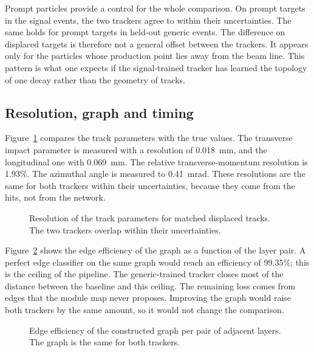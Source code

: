 Prompt particles provide a control for the whole comparison. On prompt targets in the signal events,
the two trackers agree to within their uncertainties. The same holds for prompt targets in held-out
generic events. The difference on displaced targets is therefore not a general offset between the
trackers. It appears only for the particles whose production point lies away from the beam line.
This pattern is what one expects if the signal-trained tracker has learned the topology of one decay
rather than the geometry of tracks.

\subsection{Resolution, graph and timing}
\label{sec:resolution}

Figure~\ref{fig:resolution} compares the track parameters with the true values. The transverse
impact parameter is measured with a resolution of 0.018~mm, and the longitudinal one with 0.069~mm.
The relative transverse-momentum resolution is 1.93\%. The azimuthal angle is measured to 0.41~mrad.
These resolutions are the same for both trackers within their uncertainties, because they come from
the hits, not from the network.

\begin{figure}[tbp]
  \centering
  \caption{Resolution of the track parameters for matched displaced tracks. The two trackers overlap within their uncertainties.}
  \label{fig:resolution}
\end{figure}

Figure~\ref{fig:graph} shows the edge efficiency of the graph as a function of the layer pair. A
perfect edge classifier on the same graph would reach an efficiency of 99.35\%; this is the ceiling
of the pipeline. The generic-trained tracker closes most of the distance between the baseline and
this ceiling. The remaining loss comes from edges that the module map never proposes. Improving the
graph would raise both trackers by the same amount, so it would not change the comparison.

\begin{figure}[tbp]
  \centering
  \caption{Edge efficiency of the constructed graph per pair of adjacent layers. The graph is the same for both trackers.}
  \label{fig:graph}
\end{figure}

